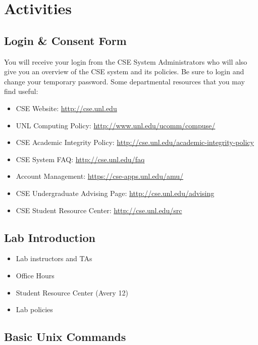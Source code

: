 \documentclass[12pt]{scrartcl}
\begin{document}
\section{Activities}

\subsection{Login \& Consent Form}

You will receive your login from the CSE System Administrators who will also 
give you an overview of the CSE system and its policies.  Be sure to login and 
change your temporary password.  Some departmental resources that you may
find useful:
\begin{itemize}
  \item CSE Website: \url{http://cse.unl.edu}
  \item UNL Computing Policy: \url{http://www.unl.edu/ucomm/compuse/}
   \item CSE Academic Integrity Policy: \url{http://cse.unl.edu/academic-integrity-policy}
   \item CSE System FAQ: \url{http://cse.unl.edu/faq}
   \item Account Management: \url{https://cse-apps.unl.edu/amu/}
   \item CSE Undergraduate Advising Page: \url{http://cse.unl.edu/advising}
   \item CSE Student Resource Center: \url{http://cse.unl.edu/src}
\end{itemize}

\subsection{Lab Introduction}

\begin{itemize}
  \item Lab instructors and TAs
  \item Office Hours
  \item Student Resource Center (Avery 12)
  \item Lab policies
\end{itemize}

\subsection{Basic Unix Commands}
\end{document}
